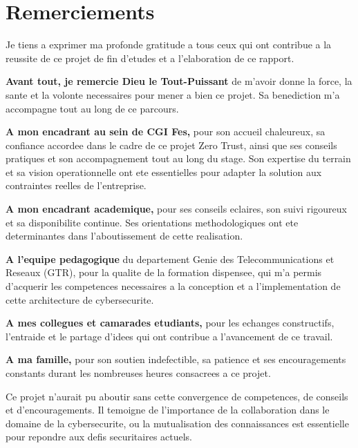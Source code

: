 \chapter*{Remerciements}

\vspace{0.5cm}

Je tiens a exprimer ma profonde gratitude a tous ceux qui ont contribue a la reussite de ce projet de fin d'etudes et a l'elaboration de ce rapport.

\vspace{0.5cm}

\textbf{Avant tout, je remercie Dieu le Tout-Puissant} de m'avoir donne la force, la sante et la volonte necessaires pour mener a bien ce projet. Sa benediction m'a accompagne tout au long de ce parcours.

\vspace{0.5cm}

\textbf{A mon encadrant au sein de CGI Fes,} pour son accueil chaleureux, sa confiance accordee dans le cadre de ce projet Zero Trust, ainsi que ses conseils pratiques et son accompagnement tout au long du stage. Son expertise du terrain et sa vision operationnelle ont ete essentielles pour adapter la solution aux contraintes reelles de l'entreprise.

\vspace{0.5cm}

\textbf{A mon encadrant academique,} pour ses conseils eclaires, son suivi rigoureux et sa disponibilite continue. Ses orientations methodologiques ont ete determinantes dans l'aboutissement de cette realisation.

\vspace{0.5cm}

\textbf{A l'equipe pedagogique} du departement Genie des Telecommunications et Reseaux (GTR), pour la qualite de la formation dispensee, qui m'a permis d'acquerir les competences necessaires a la conception et a l'implementation de cette architecture de cybersecurite.

\vspace{0.5cm}


\textbf{A mes collegues et camarades etudiants,} pour les echanges constructifs, l'entraide et le partage d'idees qui ont contribue a l'avancement de ce travail.

\vspace{0.5cm}

\textbf{A ma famille,} pour son soutien indefectible, sa patience et ses encouragements constants durant les nombreuses heures consacrees a ce projet.

\vspace{0.5cm}
Ce projet n'aurait pu aboutir sans cette convergence de competences, de conseils et d'encouragements. Il temoigne de l'importance de la collaboration dans le domaine de la cybersecurite, ou la mutualisation des connaissances est essentielle pour repondre aux defis securitaires actuels.

\vspace{1cm}

\newpage
